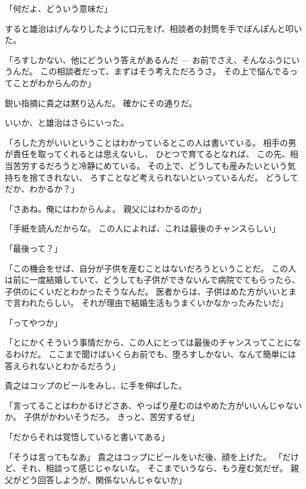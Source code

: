 \documentclass[chapter3.tex]{subfiles}
\begin{document}
\begin{CJK}{UTF8}{ipxm}
    「何だよ、どういう意味だ」

    すると雄治はげんなりしたように口元をげ、相談者の封筒を手でぽんぽんと叩いた。

    「ろすしかない、他にどういう答えがあるんだ
    ---
    お前でさえ、そんなふうにいうんだ。
    この相談者だって、まずはそう考えただろうさ。
    その上で悩んでるってことがわからんのか」

    鋭い指摘に貴之は黙り込んだ。
    確かにその通りだ。

    いいか、と雄治はさらにいった。

    「ろした方がいいということはわかっているとこの人は書いている。
    相手の男が責任を取ってくれるとは思えないし、
    ひとつで育てるとなれば、
    この先、相当苦労するだろうと冷静にめている。
    その上で、どうしても産みたいという気持ちを捨てきれない、
    ろすことなど考えられないといっているんだ。
    どうしてだか、わかるか？」

    「さあね。俺にはわからんよ。
    親父にはわかるのか」

    「手紙を読んだからな。
    この人によれば、これは最後のチャンスらしい」

    「最後って？」

    「この機会をせば、自分が子供を産むことはないだろうということだ。
    この人は前に一度結婚していて、どうしても子供ができないんで病院でてもらったら、
    子供のにくいだとわかったそうなんだ。
    医者からは、子供はめた方がいいとまで言われたらしい。
    それが理由で結婚生活もうまくいかなかったみたいだ」

    「ってやつか」

    「とにかくそういう事情だから、この人にとっては最後のチャンスってことになるわけだ。
    ここまで聞けばいくらお前でも、堕ろすしかない、なんて簡単には答えられないとわかるだろう」

    貴之はコップのビールをみし、に手を伸ばした。
    
    「言ってることはわかるけどさあ、やっぱり産むのはやめた方がいいんじゃないか。
    子供がかわいそうだろ。
    きっと、苦労するぜ」

    「だからそれは覚悟していると書いてある」

    「そうは言ってもなあ」
    貴之はコップにビールをいだ後、顔を上げた。
    「だけど、それ、相談って感じじゃないな。
    そこまでいうなら、もう産む気だぜ。
    親父がどう回答しようが、関係ないんじゃないか」


\end{CJK}
\end{document}
